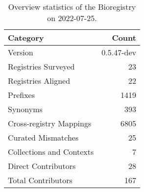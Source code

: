 \begin{table}
\centering
\caption{Overview statistics of the Bioregistry on 2022-07-25.}
\label{tab:bioregistry-summary}
\begin{tabular}{lr}
\toprule
                Category &      Count \\
\midrule
                 Version & 0.5.47-dev \\
     Registries Surveyed &         23 \\
      Registries Aligned &         22 \\
                Prefixes &       1419 \\
                Synonyms &        393 \\
 Cross-registry Mappings &       6805 \\
      Curated Mismatches &         25 \\
Collections and Contexts &          7 \\
     Direct Contributors &         28 \\
      Total Contributors &        167 \\
\bottomrule
\end{tabular}
\end{table}
